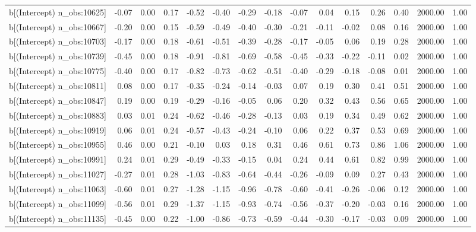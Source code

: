 \begin{table}[ht]
\begin{tabular}{rrrrrrrrrrrrrrr}
  b[(Intercept) n\_obs:10625] & -0.07 & 0.00 & 0.17 & -0.52 & -0.40 & -0.29 & -0.18 & -0.07 & 0.04 & 0.15 & 0.26 & 0.40 & 2000.00 & 1.00 \\ 
  b[(Intercept) n\_obs:10667] & -0.20 & 0.00 & 0.15 & -0.59 & -0.49 & -0.40 & -0.30 & -0.21 & -0.11 & -0.02 & 0.08 & 0.16 & 2000.00 & 1.00 \\ 
  b[(Intercept) n\_obs:10703] & -0.17 & 0.00 & 0.18 & -0.61 & -0.51 & -0.39 & -0.28 & -0.17 & -0.05 & 0.06 & 0.19 & 0.28 & 2000.00 & 1.00 \\ 
  b[(Intercept) n\_obs:10739] & -0.45 & 0.00 & 0.18 & -0.91 & -0.81 & -0.69 & -0.58 & -0.45 & -0.33 & -0.22 & -0.11 & 0.02 & 2000.00 & 1.00 \\ 
  b[(Intercept) n\_obs:10775] & -0.40 & 0.00 & 0.17 & -0.82 & -0.73 & -0.62 & -0.51 & -0.40 & -0.29 & -0.18 & -0.08 & 0.01 & 2000.00 & 1.00 \\ 
  b[(Intercept) n\_obs:10811] & 0.08 & 0.00 & 0.17 & -0.35 & -0.24 & -0.14 & -0.03 & 0.07 & 0.19 & 0.30 & 0.41 & 0.51 & 2000.00 & 1.00 \\ 
  b[(Intercept) n\_obs:10847] & 0.19 & 0.00 & 0.19 & -0.29 & -0.16 & -0.05 & 0.06 & 0.20 & 0.32 & 0.43 & 0.56 & 0.65 & 2000.00 & 1.00 \\ 
  b[(Intercept) n\_obs:10883] & 0.03 & 0.01 & 0.24 & -0.62 & -0.46 & -0.28 & -0.13 & 0.03 & 0.19 & 0.34 & 0.49 & 0.62 & 2000.00 & 1.00 \\ 
  b[(Intercept) n\_obs:10919] & 0.06 & 0.01 & 0.24 & -0.57 & -0.43 & -0.24 & -0.10 & 0.06 & 0.22 & 0.37 & 0.53 & 0.69 & 2000.00 & 1.00 \\ 
  b[(Intercept) n\_obs:10955] & 0.46 & 0.00 & 0.21 & -0.10 & 0.03 & 0.18 & 0.31 & 0.46 & 0.61 & 0.73 & 0.86 & 1.06 & 2000.00 & 1.00 \\ 
  b[(Intercept) n\_obs:10991] & 0.24 & 0.01 & 0.29 & -0.49 & -0.33 & -0.15 & 0.04 & 0.24 & 0.44 & 0.61 & 0.82 & 0.99 & 2000.00 & 1.00 \\ 
  b[(Intercept) n\_obs:11027] & -0.27 & 0.01 & 0.28 & -1.03 & -0.83 & -0.64 & -0.44 & -0.26 & -0.09 & 0.09 & 0.27 & 0.43 & 2000.00 & 1.00 \\ 
  b[(Intercept) n\_obs:11063] & -0.60 & 0.01 & 0.27 & -1.28 & -1.15 & -0.96 & -0.78 & -0.60 & -0.41 & -0.26 & -0.06 & 0.12 & 2000.00 & 1.00 \\ 
  b[(Intercept) n\_obs:11099] & -0.56 & 0.01 & 0.29 & -1.37 & -1.15 & -0.93 & -0.74 & -0.56 & -0.37 & -0.20 & -0.03 & 0.16 & 2000.00 & 1.00 \\ 
  b[(Intercept) n\_obs:11135] & -0.45 & 0.00 & 0.22 & -1.00 & -0.86 & -0.73 & -0.59 & -0.44 & -0.30 & -0.17 & -0.03 & 0.09 & 2000.00 & 1.00 \\ 

\end{tabular}
\end{table}
